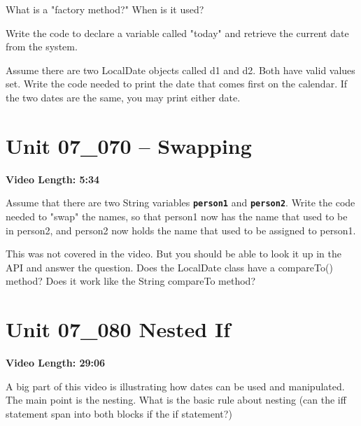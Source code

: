 \documentclass[letterpaper,12pt]{exam}
\newcommand{\unit}{Unit 07}
\begin{document}
\begin{questions}
\begin{samepage}
    \question What is a "factory method?"  When is it used?
    \vspace{5mm}
\end{samepage}
\begin{samepage}
    \question Write the code to declare a variable called "today" and retrieve the current date from the system.
    \vspace{5mm}
\end{samepage}
\begin{samepage}
    \question Assume there are two LocalDate objects called d1 and d2.  Both have valid values set.  Write the code needed to print the date that comes first on the calendar.  If the two dates are the same, you may print either date.
    \vspace{25mm}
\end{samepage}



\section*{\unit\_070 -- Swapping} %
\noindent \textbf{Video Length: 5:34}

\begin{samepage}
    \question Assume that there are two String variables \texttt{\textbf{person1}} and \texttt{\textbf{person2}}. Write the code needed to "swap" the names, so that person1 now has the name that used to be in person2, and person2 now holds the name that used to be assigned to person1.  
    \vspace{5mm}
\end{samepage}

\begin{samepage}
    \question This was not covered in the video.  But you should be able to look it up in the API and answer the question.  Does the LocalDate class have a compareTo() method?  Does it work like the String compareTo method?
    \vspace{5mm}
\end{samepage}


\section*{\unit\_080 Nested If} %
\noindent \textbf{Video Length: 29:06}
\begin{samepage}
    \question A big part of this video is illustrating how dates can be used and manipulated.  The main point is the nesting.  What is the basic rule about nesting (can the iff statement span into both blocks if the if statement?)
    \vspace{5mm}
\end{samepage}



\end{questions}
\end{document}
